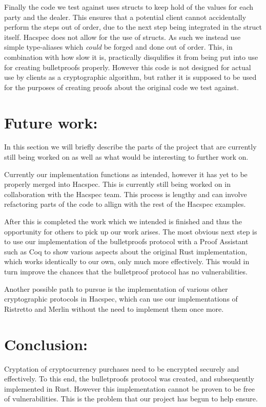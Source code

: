 \documentclass{article}
\begin{document}
Finally the code we test against uses structs to keep hold of the values for each party and the dealer. This ensures that a potential client cannot accidentally perform the steps out of order, due to the next step being integrated in the struct itself. Hacspec does not allow for the use of structs. As such we instead use simple type-aliases which \textit{could} be forged and done out of order. This, in combination with how slow it is, practically disqulifies it from being put into use for creating bulletproofs properly. However this code is not designed for actual use by clients as a cryptographic algorithm, but rather it is supposed to be used for the purposes of creating proofs about the original code we test against.


\section{Future work:}

In this section we will briefly describe the parts of the project that are currently still being worked on as well as what would be interesting to further work on.

Currently our implementation functions as intended, however it has yet to be properly merged into Hacspec. This is currently still being worked on in collaboration with the Hacspec team. This process is lengthy and can involve refactoring parts of the code to allign with the rest of the Hacspec examples.

After this is completed the work which we intended is finished and thus the opportunity for others to pick up our work arises. The most obvious next step is to use our implementation of the bulletproofs protocol with a Proof Assistant such as Coq to show various aspects about the original Rust implementation, which works identically to our own, only much more effectively. This would in turn improve the chances that the bulletproof protocol has no vulnerabilities. 

Another possible path to pursue is the implementation of various other cryptographic protocols in Hacspec, which can use our implementations of Ristretto and Merlin without the need to implement them once more.

\section{Conclusion:}

Cryptation of cryptocurrency purchases need to be encrypted securely and effectively. To this end, the bulletproofs protocol was created, and subsequently implemented in Rust. However this implementation cannot be proven to be free of vulnerabilities. This is the problem that our project has begun to help ensure. 
\end{document}
